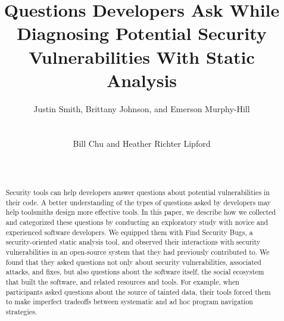 \documentclass{sig-alternate}
\begin{document}
\toappear{}
\title{Questions Developers Ask While Diagnosing Potential Security Vulnerabilities With Static Analysis}

\author{
\alignauthor Justin Smith, Brittany Johnson, and Emerson Murphy-Hill\\
\\
 \\
\alignauthor Bill Chu and Heather Richter Lipford\\
\\
\\
}

\maketitle


\begin{abstract}

Security tools can help developers answer questions about potential vulnerabilities in their code. 
A better understanding of the types of questions asked by developers may help toolsmiths design more effective tools.
In this paper, we describe how we collected and categorized these questions 
by conducting an exploratory study with novice and experienced software developers.
We equipped them with Find Security Bugs, a security-oriented static analysis tool, and observed their interactions with security vulnerabilities in an open-source system that they had previously contributed to.
We found that they asked questions not only about security vulnerabilities, associated attacks, and fixes,
but also questions about the software itself, the social ecosystem that built the software,
and related resources and tools.
For example, when participants asked questions about the source of tainted data,
their tools forced them to make imperfect tradeoffs between 
systematic and ad hoc program navigation strategies.
\end{abstract}
\end{document}
